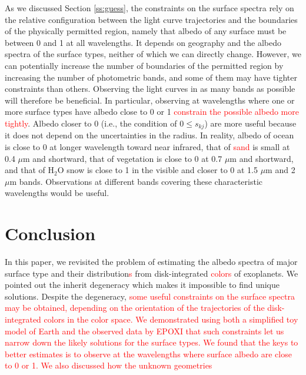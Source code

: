 \documentclass[iop,numberedappendix,apj]{emulateapj}
\def\edit#1{\textcolor{red}{#1}}
\begin{document}
As we discussed Section \ref{ss:guess}, the constraints on the surface spectra rely on the relative configuration between the light curve trajectories and the boundaries of the physically permitted region, namely that albedo of any surface must be between 0 and 1 at all wavelengths. 
It depends on geography and the albedo spectra of the surface types, neither of which we can directly change. 
However, we can potentially increase the number of boundaries of the permitted region by increasing the number of photometric bands, and some of them may have tighter constraints than others. 
Observing the light curves in as many bands as possible will therefore be beneficial.  
In particular, observing at wavelengths where one or more surface types have albedo close to 0 or 1 \edit{constrain the possible albedo more tightly}. 
Albedo closer to 0 (i.e., the condition of $0 \le s_{kj}$) are more useful because it does not depend on the uncertainties in the radius. 
In reality, albedo of ocean is close to 0 at longer wavelength toward near infrared, that of \edit{sand} is small at 0.4 $\mu $m and shortward, that of vegetation is close to 0 at 0.7 $\mu$m and shortward, and that of H$_2$O snow is close to 1 in the visible and closer to 0 at 1.5 $\mu$m and 2 $\mu$m bands. 
Observations at different bands covering these characteristic wavelengths would be useful. 





\section{Conclusion}
\label{s:conclusion}

In this paper, we revisited the problem of estimating the albedo spectra of major surface type and their distribution\edit{s} from disk-integrated \edit{colors} of exoplanets. 
We pointed out the inherit degeneracy which makes it impossible to find unique solutions. 
Despite the degeneracy, 
\edit{some useful constraints on the surface spectra may be obtained, depending on the orientation of the trajectories of the disk-integrated colors in the color space.  %
We demonstrated using both a simplified toy model of Earth and the observed data by EPOXI that such constraints let us narrow down the likely solutions for the surface types. %
We found that the keys to better estimates is to observe at the wavelengths where surface albedo are close to 0 or 1. %
We also discussed how the unknown geometries }
\end{document}
